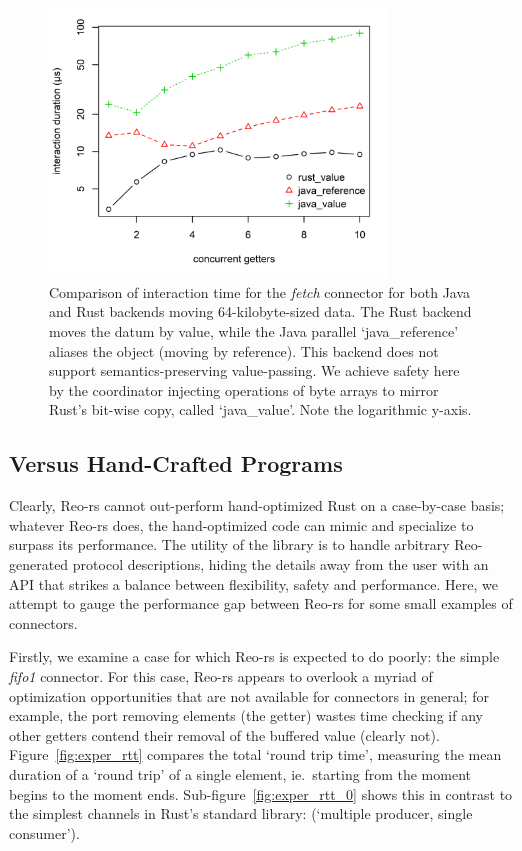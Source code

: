 \begin{figure}
	\centering
	\includegraphics[width=0.80\textwidth]{experiments/rust_v_java_2.png}
	\caption[Java vs.\ Rust interaction time for large values.]{Comparison of interaction time for the \textit{fetch} connector for both Java and Rust backends moving 64-kilobyte-sized data. The Rust backend moves the datum by value, while the Java parallel `java\_reference' aliases the object (moving by reference). This backend does not support semantics-preserving value-passing. We achieve safety here by the coordinator injecting  operations of byte arrays to mirror Rust's bit-wise copy, called `java\_value'. Note the logarithmic y-axis.}
	\label{fig:rust_v_java_2}
\end{figure}

\subsection{Versus Hand-Crafted Programs}

Clearly, Reo-rs cannot out-perform hand-optimized Rust on a case-by-case basis; whatever Reo-rs does, the hand-optimized code can mimic and specialize to surpass its performance. The utility of the library is to handle arbitrary Reo-generated protocol descriptions, hiding the details away from the user with an API that strikes a balance between flexibility, safety and performance. Here, we attempt to gauge the performance gap between Reo-rs for some small examples of connectors.

Firstly, we examine a case for which Reo-rs is expected to do poorly: the simple \textit{fifo1} connector. For this case, Reo-rs appears to overlook a myriad of optimization opportunities that are not available for connectors in general; for example, the port removing elements (the getter) wastes time checking if any other getters contend their removal of the buffered value (clearly not). Figure~\ref{fig:exper_rtt} compares the total `round trip time', measuring the mean duration of a `round trip' of a single element, ie.\ starting from the moment  begins to the moment  ends. Sub-figure~\ref{fig:exper_rtt_0} shows this in contrast to the simplest channels in Rust's standard library:  (`multiple producer, single consumer').


